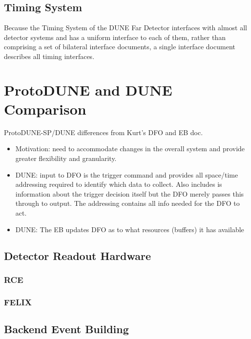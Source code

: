 \subsection{Timing System}
Because the Timing System of the DUNE Far Detector interfaces with
almost all detector systems and has a uniform interface to each of
them, rather than comprising a set of 
bilateral interface documents, a single interface document
\cite{docid-11224} describes all timing interfaces. 

\section{ProtoDUNE and DUNE Comparison}


ProtoDUNE-SP/DUNE differences from Kurt's DFO and EB doc.
\begin{itemize}
\item Motivation: need to accommodate changes in the overall system and provide greater flexibility and granularity.
\item DUNE: input to DFO is the trigger command and provides all space/time addressing required to identify which data to collect.  Also includes is information about the trigger decision itself but the DFO merely passes this through to output.  The addressing contains all info needed for the DFO to act.
\item DUNE: The EB updates DFO as to what resources (buffers) it has available
\end{itemize}

\subsection{Detector Readout Hardware}


\subsubsection{RCE}

\subsubsection{FELIX}

\subsection{Backend Event Building}

